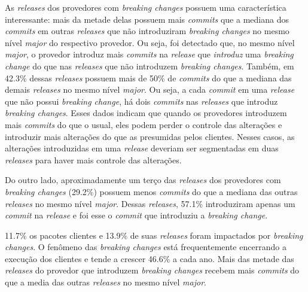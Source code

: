 As \textit{releases} dos provedores com \textit{breaking changes} possuem uma característica interessante: mais da metade delas possuem mais \textit{commits} que a mediana dos \textit{commits} em outras \textit{releases} que não introduziram \textit{breaking changes} no mesmo nível \textit{major} do respectivo provedor. Ou seja, foi detectado que, no mesmo nível \textit{major}, o provedor introduz mais \textit{commits} na \textit{release} que \textit{introduz} uma \textit{breaking change} do que nas \textit{releases} que não introduzem \textit{breaking changes}. Também, em 42.3\% dessas \textit{releases} possuem mais de 50\% de \textit{commits} do que a mediana das demais \textit{releases} no mesmo nível \textit{major}. Ou seja, a cada \textit{commit} em uma \textit{release} que não possui \textit{breaking change}, há dois \textit{commits} nas \textit{releases} que introduz \textit{breaking changes}. Esses dados indicam que quando os provedores introduzem mais \textit{commits} do que o usual, eles podem perder o controle das alterações e introduzir mais alterações do que as presumidas pelos clientes. Nesses casos, as alterações introduzidas em uma \textit{release} deveriam ser segmentadas em duas \textit{releases} para haver mais controle das alterações.

Do outro lado, aproximadamente um terço das \textit{releases} dos provedores com \textit{breaking changes} (29.2\%) possuem menos \textit{commits} do que a mediana das outras \textit{releases} no mesmo nível \textit{major}. Dessas \textit{releases}, 57.1\% introduziram apenas um \textit{commit} na \textit{release} e foi esse o \textit{commit} que introduziu a \textit{breaking change}.

\begin{mdframed}
11.7\% os pacotes clientes e 13.9\% de suas \textit{releases} foram impactados por \textit{breaking changes}. O fenômeno das \textit{breaking changes} está frequentemente encerrando a execução dos clientes e tende a crescer 46.6\% a cada ano. Mais das metade das \textit{releases} do provedor que introduzem \textit{breaking changes} recebem mais \textit{commits} do que a media das outras \textit{releases} no mesmo nível \textit{major}.
\end{mdframed}